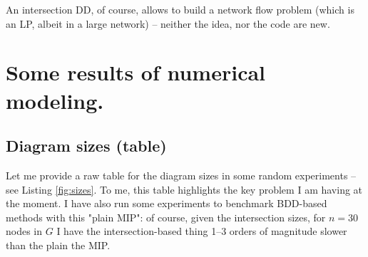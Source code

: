 \documentclass[11pt]{article}
\begin{document}
An intersection DD, of course, allows to build a network flow problem (which is
an LP, albeit in a large network) -- neither the idea, nor the code are new.

\section{Some results of numerical modeling.}
\label{sec:org405fbbd}

\subsection{Diagram sizes (table)}
\label{sec:org01a65ba}
Let me provide a raw table for the diagram sizes in some random experiments --
see Listing \ref{fig:sizes}. To me, this table highlights the key problem I am having
at the moment. I have also run some experiments to benchmark BDD-based methods
with this "plain MIP": of course, given the intersection sizes, for \(n=30\) nodes
in \(G\) I have the intersection-based thing 1--3 orders of
magnitude slower than the plain the MIP.
\end{document}
